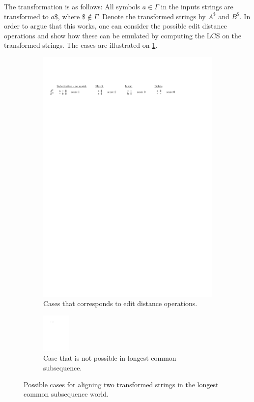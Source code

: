 \documentclass[twoside,11pt,openright]{report}
\begin{document}
The transformation is as follows: All symbols $a \in \Gamma$ in the inputs strings are transformed to $a\$$, where $\$ \not\in \Gamma$. Denote the transformed strings by $A^{\$}$ and $B^{\$}$. In order to argue that this works, one can consider the possible edit distance operations and show how these can be emulated by computing the LCS on the transformed strings. The cases are illustrated on \cref{fig:blow-up:edit-dist-cases}.
%
\begin{figure}[h!]
  \centering
  \begin{subfigure}{0.8\textwidth}
    \includegraphics[width=\textwidth]{images/blow-up-edit-dist-cases}
    \caption{Cases that corresponds to edit distance operations.}
    \label{fig:blow-up:edit-dist-cases}
  \end{subfigure}
  \begin{subfigure}{0.8\textwidth}
    \centering
    \includegraphics[width=0.15\textwidth]{images/blow-up-not-possible-case}
    \caption{Case that is not possible in longest common subsequence.}
    \label{fig:blow-up:not-possible}
  \end{subfigure}
  \caption{Possible cases for aligning two transformed strings in the longest common subsequence world.}
\end{figure}%
\end{document}
